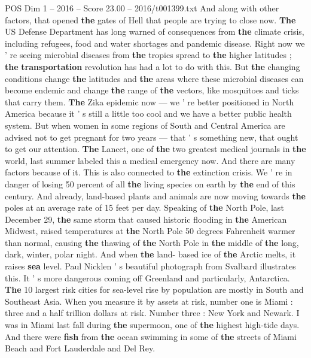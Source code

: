 \begin{textsample}{POS Dim 1 – 2016 – Score 23.00 – 2016/t001399.txt}
And along with other factors, that opened \textbf{the} gates of Hell that people are trying to close now. \textbf{The} US Defense Department has long warned of consequences from \textbf{the} climate crisis, including refugees, food and water shortages and pandemic disease.
Right now we ' re seeing microbial diseases from \textbf{the} tropics spread to \textbf{the} higher latitudes ; \textbf{the} \textbf{transportation} revolution has had a lot to do with this.
But \textbf{the} changing conditions change \textbf{the} latitudes and \textbf{the} areas where these microbial diseases can become endemic and change \textbf{the} range of \textbf{the} vectors, like mosquitoes and ticks that carry them. \textbf{The} Zika epidemic now — we ' re better positioned in North America because it ' s still a little too cool and we have a better public health system.
But when women in some regions of South and Central America are advised not to get pregnant for two years — that ' s something new, that ought to get our attention. \textbf{The} Lancet, one of \textbf{the} two greatest medical journals in \textbf{the} world, last summer labeled this a medical emergency now.
And there are many factors because of it.
This is also connected to \textbf{the} extinction crisis.
We ' re in danger of losing 50 percent of all \textbf{the} living species on earth by \textbf{the} end of this century.
And already, land-based plants and animals are now moving towards \textbf{the} poles at an average rate of 15 feet per day.
Speaking of \textbf{the} North Pole, last December 29, \textbf{the} same storm that caused historic flooding in \textbf{the} American Midwest, raised temperatures at \textbf{the} North Pole 50 degrees Fahrenheit warmer than normal, causing \textbf{the} thawing of \textbf{the} North Pole in \textbf{the} middle of \textbf{the} long, dark, winter, polar night.
And when \textbf{the} land- based ice of \textbf{the} Arctic melts, it raises \textbf{sea} level.
Paul Nicklen ' s beautiful photograph from Svalbard illustrates this.
It ' s more dangerous coming off Greenland and particularly, Antarctica. \textbf{The} 10 largest risk cities for sea-level rise by population are mostly in South and Southeast Asia.
When you measure it by assets at risk, number one is Miami : three and a half trillion dollars at risk.
Number three : New York and Newark.
I was in Miami last fall during \textbf{the} supermoon, one of \textbf{the} highest high-tide days.
And there were \textbf{fish} from \textbf{the} ocean swimming in some of \textbf{the} streets of Miami Beach and Fort Lauderdale and Del Rey.

\end{textsample}
